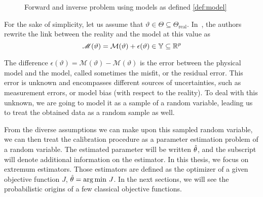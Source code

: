 \documentclass[../../Main_ManuscritThese.tex]{subfiles}
\newcommand\imgpath{/home/victor/acadwriting/Manuscrit/Text/Chapter2/img/}
\begin{document}
\begin{figure}[ht]
  \centering
  
  \caption{Forward and inverse problem using models as defined \cref{def:model}}
  \label{fig:inv_problem}
\end{figure}

% 

For the sake of simplicity, let us assume that $\vartheta \in \Theta \subseteq \Theta_{\mathrm{real}}$. In~\cite{kennedy_bayesian_2001,higdon_combining_2004}, the authors rewrite the link between the reality and the model at this value as 
\begin{equation}
  \label{eq:vartheta_models}
    \mathscr{M}(\vartheta) = %
    \mathcal{M}(\vartheta) + \epsilon(\vartheta) \in \Yspace \subseteq \mathbb{R}^p
  \end{equation}
 
  The difference $\epsilon(\vartheta) = \mathscr{M}(\vartheta) - \mathcal{M}(\vartheta)$ is the error between the physical model and the model, called sometimes the misfit, or the residual error.
  This error is unknown and encompasses different sources of uncertainties, such as measurement errors, or model bias (with respect to the reality). To deal with this unknown, we are going to model it as a sample of a random variable, leading us to treat the obtained data as a random sample as well.

  From the diverse assumptions we can make upon this sampled random variable, we can then treat the calibration procedure as a parameter estimation problem of a random variable.
  The estimated parameter will be written $\hat{\theta}$, and the subscript will denote additional information on the estimator. 
  In this thesis, we focus on extremum estimators. Those estimators are defined as the optimizer of a given objective function $J$, $\hat{\theta} = \operatorname*{arg\,min \,} J$. In the next sections, we will see the probabilistic origins of a few classical objective functions.
\end{document}
